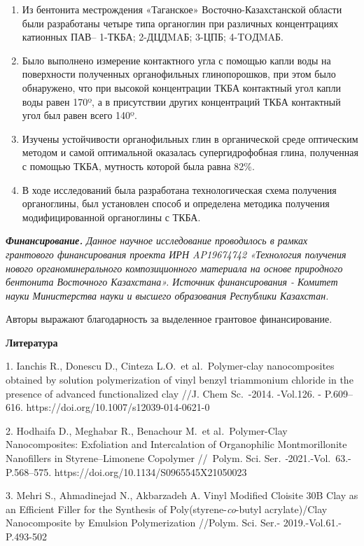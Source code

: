 \begin{enumerate}
\def\labelenumi{\arabic{enumi}.}
\item
  Из бентонита местрождения «Таганское» Восточно-Казахстанской области
  были разработаны четыре типа органоглин при различных концентрациях
  катионных ПАВ-- 1-ТКБА; 2-ДЦДMAБ; 3-ЦПБ; 4-TOДMAБ.
\item
  Было выполнено измерение контактного угла с помощью капли воды на
  поверхности полученных органофильных глинопорошков, при этом было
  обнаружено, что при высокой концентрации ТКБА контактный угол капли
  воды равен 170º, а в присутствии других концентраций ТКБА контактный
  угол был равен всего 140º.
\item
  Изучены устойчивости органофильных глин в органической среде
  оптическим методом и самой оптимальной оказалась супергидрофобная
  глина, полученная с помощью ТКБА, мутность которой была равна 82\%.
\item
  В ходе исследований была разработана технологическая схема получения
  органоглины, был установлен способ и определена методика получения
  модифицированной органоглины с ТКБА.
\end{enumerate}

\emph{{\bfseries Финансирование.} Данное научное исследование проводилось в
рамках грантового финансирования проекта ИРН AP19674742 «Технология
получения нового органоминерального композиционного материала на основе
природного бентонита Восточного Казахстана». Источник финансирования -
Комитет науки Министерства науки и высшего образования Республики
Казахстан.}

Авторы выражают благодарность за выделенное грантовое финансирование.

{\bfseries Литература}

1. Ianchis R., Donescu D., Cinteza L.O.~et al\emph{.}~Polymer-clay
nanocomposites obtained by solution polymerization of vinyl benzyl
triammonium chloride in the presence of advanced functionalized clay
//J. Chem Sc.~-2014. -Vol.126. - P.609--616.
https://doi.org/10.1007/s12039-014-0621-0

2. Hodhaifa D., Meghabar R., Benachour M.~et al\emph{.}~Polymer-Clay
Nanocomposites: Exfoliation and Intercalation of Organophilic
Montmorillonite Nanofillers in Styrene--Limonene Copolymer //~Polym.
Sci. Ser\emph{. -}2021.-Vol.~63.- P.568--575.
https://doi.org/10.1134/S0965545X21050023

3. Mehri S., Ahmadinejad N., Akbarzadeh A. Vinyl Modified Cloisite 30B
Clay as an Efficient Filler for the Synthesis of
Poly(styrene-\emph{co}-butyl acrylate)/Clay Nanocomposite by Emulsion
Polymerization //Polym. Sci. Ser.- 2019.-Vol.61.-P.493-502

